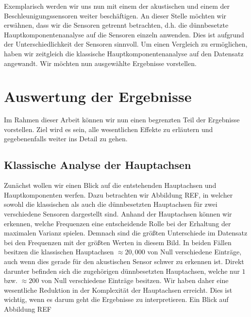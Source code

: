Exemplarisch werden wir uns nun mit einem der akustischen und einem der Beschleunigungssensoren weiter beschäftigen. An dieser Stelle möchten wir erwähnen, dass wir die Sensoren getrennt betrachten, d.h. die dünnbesetzte Hauptkomponentenanalyse auf die Sensoren einzeln anwenden. Dies ist aufgrund der Unterschiedlichkeit der Sensoren sinnvoll. Um einen Vergleich zu ermöglichen, haben wir zeitgleich die klassische Hauptkomponentenanalyse auf den Datensatz angewandt. Wir möchten nun ausgewählte Ergebnisse vorstellen. 




\section{Auswertung der Ergebnisse}
\label{evaluation}

Im Rahmen dieser Arbeit können wir nun einen begrenzten Teil der Ergebnisse vorstellen. Ziel wird es sein, alle wesentlichen Effekte zu erläutern und gegebenenfalls weiter ins Detail zu gehen. 




\subsection{Klassische Analyse der Hauptachsen}

Zunächst wollen wir einen Blick auf die entstehenden Hauptachsen und Hauptkomponenten werfen. Dazu betrachten wir Abbildung REF, in welcher sowohl die klassischen als auch die dünnbesetzten Hauptachsen für zwei verschiedene Sensoren dargestellt sind. Anhand der Hauptachsen können wir erkennen, welche Frequenzen eine entscheidende Rolle bei der Erhaltung der maximalen Varianz spielen. Demnach sind die größten Unterschiede im Datensatz bei den Frequenzen mit der größten Werten in diesem Bild. In beiden Fällen besitzen die klassischen Hauptachsen $\approx20,000$ von Null verschiedene Einträge, auch wenn dies gerade für den akustischen Sensor schwer zu erkennen ist. Direkt darunter befinden sich die zugehörigen dünnbesetzten Hauptachsen, welche nur $1$ bzw. $\approx200$ von Null verschiedene Einträge besitzen. Wir haben daher eine wesentliche Reduktion in der Komplexität der Hauptachsen erreicht. Dies ist wichtig, wenn es darum geht die Ergebnisse zu interpretieren. Ein Blick auf Abbildung REF

